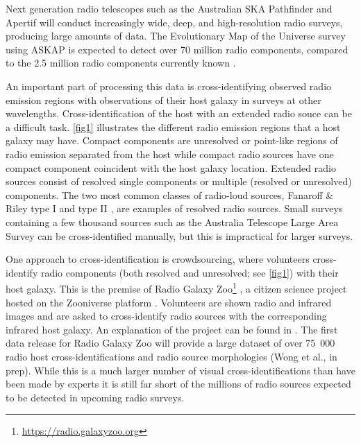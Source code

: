 \documentclass[fleqn,usenatbib,usedcolumn]{mnras}
\begin{document}
  Next generation radio telescopes such as the Australian SKA Pathfinder
  \citep[ASKAP;][]{johnston07} and Apertif \citep{verheijen08} will conduct
  increasingly wide, deep, and high-resolution radio surveys, producing large
  amounts of data. The Evolutionary Map of the Universe survey
  \citep[EMU;][]{norris11} using ASKAP is expected to detect over 70 million
  radio components, compared to the 2.5 million radio components currently
  known \citep{banfield15}.

  An important part of processing this data is cross-identifying observed
  radio emission regions with observations of their host galaxy in surveys at
  other wavelengths. Cross-identification of the host with an extended radio
  souce can be a difficult task. \autoref{fig1} illustrates the different
  radio emission regions that a host galaxy may have. Compact components are
  unresolved or point-like regions of radio emission separated from the host
  while compact radio sources have one compact component coincident with the
  host galaxy location. Extended radio sources consist of resolved single
  components or multiple (resolved or unresolved) components. The two most
  common classes of radio-loud sources, Fanaroff \& Riley type I and type II
  \citep{Fanaroff1974}, are examples of resolved radio sources. Small surveys
  containing a few thousand sources such as the Australia Telescope Large Area Survey
  \citep[ATLAS;][]{norris06,middelberg08} can be cross-identified manually,
  but this is impractical for larger surveys.

  One approach to cross-identification is crowdsourcing, where volunteers
  cross-identify radio components (both resolved and unresolved; see
  \autoref{fig1}) with their host galaxy. This is the premise of Radio Galaxy
  Zoo\footnote{\url{https://radio.galaxyzoo.org}} \citep{banfield15}, a
  citizen science project hosted on the Zooniverse platform \citep{lintott08}.
  Volunteers are shown radio and infrared images and are asked to
  cross-identify radio sources with the corresponding infrared host galaxy. An
  explanation of the project can be found in \citet{banfield15}. The first
  data release for Radio Galaxy Zoo will provide a large dataset of over
  75~000 radio host cross-identifications and radio source morphologies
  (Wong et al., in prep). While this is a much larger number of visual
  cross-identifications than have been made by experts \citep[e.g.,
  ][]{Taylor2007,Gendre2008,Grant2010,norris06,middelberg08} it is still far
  short of the millions of radio sources expected to be detected in upcoming
  radio surveys.
\end{document}
